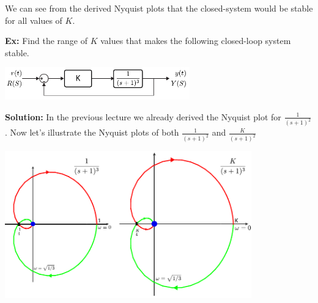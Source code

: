 \documentclass{article}
\begin{document}
\vspace{6 pt}

We can see from the derived Nyquist plots that the closed-system
would be stable for all values of $K$.

\vspace{6 pt}

\textbf{Ex:} Find the range of $K$ values that makes the
following closed-loop system stable. 

\vspace{6 pt}

  \begin{minipage}[h]{1\linewidth}
    \begin{center}
      \includegraphics[width=0.6\textwidth]{figs/ex3block}
    \end{center}
  \end{minipage}

\vspace{6 pt}

\textbf{Solution:} In the previous lecture we already derived the
Nyquist plot for $\frac{1}{(s+1)^2}$. Now let's illustrate the Nyquist
plots of both $\frac{1}{(s+1)^2}$ and $\frac{K}{(s+1)^2}$

\vspace{6 pt}

  \begin{minipage}[h]{1\linewidth}
    \begin{center}
      \includegraphics[width=0.8\textwidth]{figs/exK2}
    \end{center}
  \end{minipage}

\vspace{6 pt}
\end{document}
